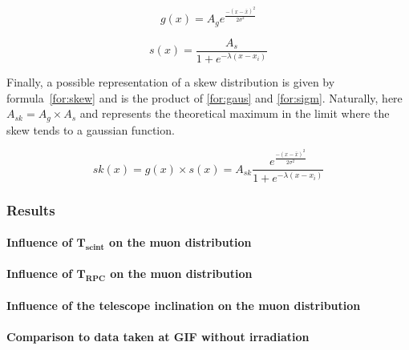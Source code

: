 			\begin{center}
				\begin{equation}
				\label{for:gaus}
					g(x) = A_g e^{\frac{-(x-\bar{x})^2}{2\sigma^2}}
				\end{equation}
			\end{center}
			
			\begin{center}
				\begin{equation}
				\label{for:sigm}
					s(x) = \frac{A_s}{1+e^{-\lambda(x-x_i)}}
				\end{equation}
			\end{center}
			
		Finally, a possible representation of a skew distribution is given by formula~\ref{for:skew} and is the product of \ref{for:gaus} and \ref{for:sigm}. Naturally, here $A_{sk} = A_g \times A_s$ and represents the theoretical maximum in the limit where the skew tends to a gaussian function.
			
			\begin{center}
				\begin{equation}
				\label{for:skew}
					sk(x) = g(x)\times s(x) = A_{sk}\frac{e^{\frac{-(x-\bar{x})^2}{2\sigma^2}}}{1+e^{-\lambda(x-x_i)}}
				\end{equation}
			\end{center}
			
		\subsubsection{Results}
		\label{sssec:SimRes}
			
			\paragraph{Influence of $\mathbf{T_{scint}}$ on the muon distribution}
			
			\paragraph{Influence of $\mathbf{T_{RPC}}$ on the muon distribution}
		
			\paragraph{Influence of the telescope inclination on the muon distribution}
			
			\paragraph{Comparison to data taken at GIF without irradiation}
		
